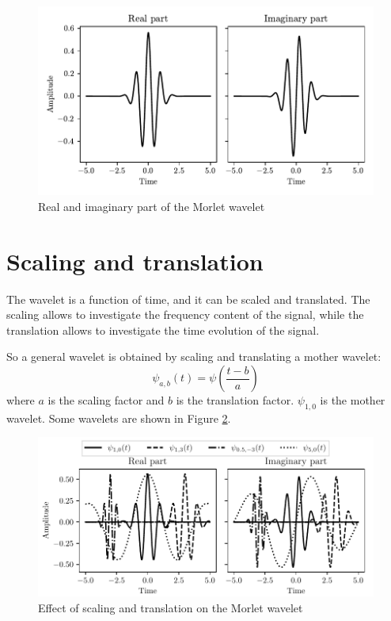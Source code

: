 \begin{figure}
\centering
\includegraphics[]{images/morlet.pdf}
\caption{Real and imaginary part of the Morlet wavelet}
\label{fig:morlet}
\end{figure}

\section{Scaling and translation}
The wavelet is a function of time, and it can be scaled and translated. The scaling allows to investigate the frequency content of the signal, while the translation allows to investigate the time evolution of the signal.

So a general wavelet is obtained by scaling and translating a mother wavelet:
\begin{equation}
\psi_{a,b}(t) =  \psi \left( \frac{t-b}{a} \right)
\end{equation}
where $a$ is the scaling factor and $b$ is the translation factor. $\psi_{1,0}$ is the mother wavelet. Some wavelets are shown in Figure \ref{fig:wavelets}.

\begin{figure}
\centering
\includegraphics{images/morlet_trasl.pdf}
\caption{Effect of scaling and translation on the Morlet wavelet}
\label{fig:wavelets}
\end{figure}

